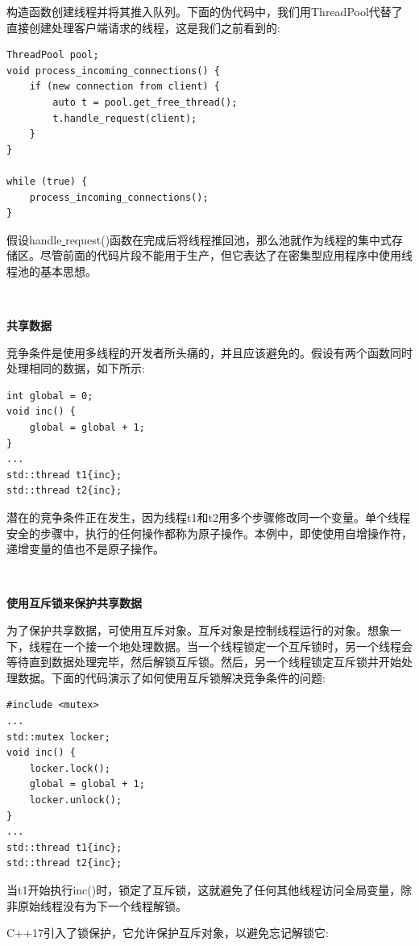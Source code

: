 构造函数创建线程并将其推入队列。下面的伪代码中，我们用ThreadPool代替了直接创建处理客户端请求的线程，这是我们之前看到的: \par

\begin{lstlisting}[caption={}]
ThreadPool pool;
void process_incoming_connections() {
	if (new connection from client) {
		auto t = pool.get_free_thread();
		t.handle_request(client);
	}
}

while (true) {
	process_incoming_connections();
}
\end{lstlisting}

假设handle\underline{ }request()函数在完成后将线程推回池，那么池就作为线程的集中式存储区。尽管前面的代码片段不能用于生产，但它表达了在密集型应用程序中使用线程池的基本思想。 \par

\noindent\textbf{}\ \par
\textbf{共享数据} \ \par
竞争条件是使用多线程的开发者所头痛的，并且应该避免的。假设有两个函数同时处理相同的数据，如下所示: \par

\begin{lstlisting}[caption={}]
int global = 0;
void inc() {
	global = global + 1;
}
...
std::thread t1{inc};
std::thread t2{inc};
\end{lstlisting}

潜在的竞争条件正在发生，因为线程t1和t2用多个步骤修改同一个变量。单个线程安全的步骤中，执行的任何操作都称为原子操作。本例中，即使使用自增操作符，递增变量的值也不是原子操作。 \par

\noindent\textbf{}\ \par
\textbf{使用互斥锁来保护共享数据} \ \par
为了保护共享数据，可使用互斥对象。互斥对象是控制线程运行的对象。想象一下，线程在一个接一个地处理数据。当一个线程锁定一个互斥锁时，另一个线程会等待直到数据处理完毕，然后解锁互斥锁。然后，另一个线程锁定互斥锁并开始处理数据。下面的代码演示了如何使用互斥锁解决竞争条件的问题: \par

\begin{lstlisting}[caption={}]
#include <mutex>
...
std::mutex locker;
void inc() {
	locker.lock();
	global = global + 1;
	locker.unlock();
}
...
std::thread t1{inc};
std::thread t2{inc};
\end{lstlisting}

当t1开始执行inc()时，锁定了互斥锁，这就避免了任何其他线程访问全局变量，除非原始线程没有为下一个线程解锁。 \par
C++17引入了锁保护，它允许保护互斥对象，以避免忘记解锁它: \par


